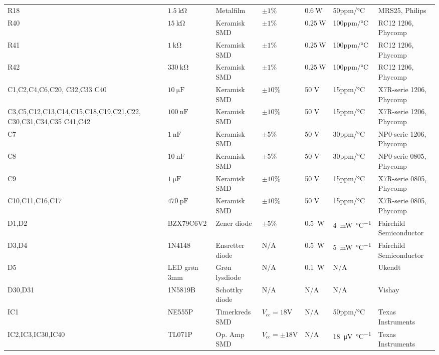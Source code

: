 \begin{table}[h!]
\begin{threeparttable}
\begin{tabular}{ l l l l l l l }
R18 & $\SI{1.5}{\kilo\ohm}$		& Metalfilm	& $\pm 1\%$ 		 & $\SI{0.6}{\watt}$	  & 50ppm/\si{\celsius}  & MRS25, Philips \\
R40 & $\SI{15}{\kilo\ohm}$ 	& Keramisk SMD 	& $\pm 1\%$			& $\SI{0.25}{\watt}$ 	& 100ppm/\si{\celsius}	& RC12 1206, Phycomp \\
R41 & $\SI{1}{\kilo\ohm}$ 	& Keramisk SMD 	& $\pm 1\%$			& $\SI{0.25}{\watt}$ 	& 100ppm/\si{\celsius}	& RC12 1206, Phycomp \\
R42 & $\SI{330}{\kilo\ohm}$ 	& Keramisk SMD 	& $\pm 1\%$			& $\SI{0.25}{\watt}$ 	& 100ppm/\si{\celsius}	& RC12 1206, Phycomp \\
C1,C2,C4,C6,C20, C32,C33 C40 & $\SI{10}{\micro\farad}$ & Keramisk SMD & $\pm 10\%$ & 50 \si{\volt}  & 15ppm/\si{\celsius} & X7R-serie 1206, Phycomp \\
C3,C5,C12,C13,C14,C15,C18,C19,C21,C22, C30,C31,C34,C35 C41,C42 & $\SI{100}{\nano\farad}$ & Keramisk SMD & $\pm 10\%$ & 50 \si{\volt} & 15ppm/\si{\celsius} & X7R-serie 1206, Phycomp \\
C7 & $\SI{1}{\nano\farad}$ & Keramisk SMD & $\pm 5\%$ & 50 \si{\volt} & 30ppm/\si{\celsius} & NP0-serie 1206, Phycomp \\
C8 & $\SI{10}{\nano\farad}$ & Keramisk SMD & $\pm 5\%$ & 50 \si{\volt} & 30ppm/\si{\celsius} & NP0-serie 0805, Phycomp \\
C9 & $\SI{1}{\micro\farad}$ & Keramisk SMD & $\pm 10\%$ & 50 \si{\volt} & 15ppm/\si{\celsius} & X7R-serie 0805, Phycomp \\
C10,C11,C16,C17 & $\SI{470}{\pico\farad}$ & Keramisk SMD & $\pm 10\%$ & 50 \si{\volt} & 15ppm/\si{\celsius} & X7R-serie 0805, Phycomp \\
D1,D2 & BZX79C6V2 & Zener diode & $\pm 5 \%$ & \SI{0.5}{\watt} & \SI{4}{\milli\watt\per\celsius} & Fairchild Semiconductor \\
D3,D4 & 1N4148 & Ensretter diode & N/A & \SI{0.5}{\watt} & \SI{5}{\milli\watt\per\celsius} & Fairchild Semiconductor \\
D5 & LED grøn 3mm & Grøn lysdiode & N/A & \SI{0.1}{\watt} & N/A & Ukendt \\
D30,D31 & 1N5819B & Schottky diode & N/A & N/A & N/A & Vishay \\
IC1 & NE555P & Timerkreds SMD & $V_{cc}= 18 \si{\volt}$ & N/A & 50ppm/\si{\celsius} & Texas Instruments \\
IC2,IC3,IC30,IC40 & TL071P & Op. Amp SMD & $V_{cc}=\pm 18 \si{\volt}$ & N/A & \SI{18}{\micro\volt\per\celsius} & Texas Instruments \\

\end{tabular}
\end{threeparttable}
\end{table}
